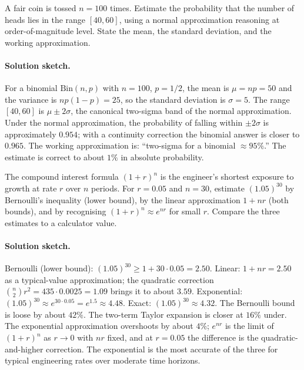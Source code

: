 \begin{exercise}
A fair coin is tossed $n = 100$ times. Estimate the probability that
the number of heads lies in the range $[40, 60]$, using a normal
approximation reasoning at order-of-magnitude level. State the
mean, the standard deviation, and the working approximation.

\paragraph{Solution sketch.}
For a binomial $\text{Bin}(n, p)$ with $n = 100$, $p = 1/2$, the
mean is $\mu = np = 50$ and the variance is $np(1-p) = 25$, so the
standard deviation is $\sigma = 5$. The range $[40, 60]$ is $\mu
\pm 2 \sigma$, the canonical two-sigma band of the normal
approximation. Under the normal approximation, the probability of
falling within $\pm 2 \sigma$ is approximately $0.954$; with a
continuity correction the binomial answer is closer to $0.965$. The
working approximation is: ``two-sigma for a binomial $\approx 95
\%$.'' The estimate is correct to about $1 \%$ in absolute
probability.
\end{exercise}

\begin{exercise}
The compound interest formula $(1 + r)^{n}$ is the engineer's
shortest exposure to growth at rate $r$ over $n$ periods. For $r =
0.05$ and $n = 30$, estimate $(1.05)^{30}$ by Bernoulli's
inequality (lower bound), by the linear approximation $1 + nr$
(both bounds), and by recognising $(1 + r)^{n} \approx
e^{nr}$ for small $r$. Compare the three estimates to a calculator
value.

\paragraph{Solution sketch.}
Bernoulli (lower bound): $(1.05)^{30} \geq 1 + 30 \cdot 0.05 = 2.50$.
Linear: $1 + nr = 2.50$ as a typical-value approximation; the
quadratic correction $\binom{n}{2} r^{2} = 435 \cdot 0.0025 = 1.09$
brings it to about $3.59$.
Exponential: $(1.05)^{30} \approx e^{30 \cdot 0.05} = e^{1.5}
\approx 4.48$.
Exact: $(1.05)^{30} \approx 4.32$. The Bernoulli bound is loose by
about $42 \%$. The two-term Taylor expansion is closer at $16 \%$
under. The exponential approximation overshoots by about $4 \%$;
$e^{nr}$ is the limit of $(1 + r)^{n}$ as $r \to 0$ with $nr$ fixed,
and at $r = 0.05$ the difference is the quadratic-and-higher
correction. The exponential is the most accurate of the three for
typical engineering rates over moderate time horizons.
\end{exercise}

